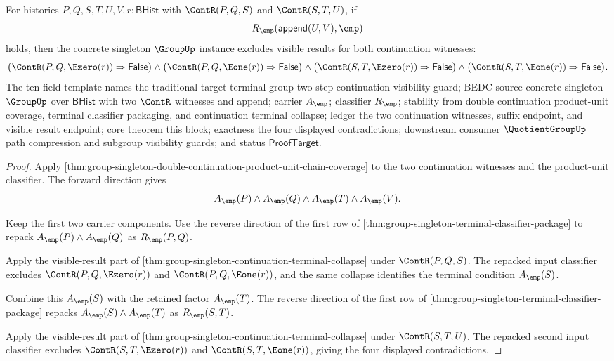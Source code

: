 \begin{theorem}
\label{thm:group-singleton-double-continuation-product-unit-visible-exclusion}
For histories $P,Q,S,T,U,V,r:\mathsf{BHist}$ with $\ContR(P,Q,S)$ and
$\ContR(S,T,U)$, if
$$
R_{\emp}(\mathsf{append}(U,V),\emp)
$$
holds, then the concrete singleton $\GroupUp$ instance excludes visible results
for both continuation witnesses:
$$
\bigl(\ContR(P,Q,\Ezero(r))\Rightarrow\mathsf{False}\bigr)\land
\bigl(\ContR(P,Q,\Eone(r))\Rightarrow\mathsf{False}\bigr)\land
\bigl(\ContR(S,T,\Ezero(r))\Rightarrow\mathsf{False}\bigr)\land
\bigl(\ContR(S,T,\Eone(r))\Rightarrow\mathsf{False}\bigr).
$$
The ten-field template names the traditional target terminal-group two-step
continuation visibility guard; BEDC source concrete singleton $\GroupUp$ over
$\mathsf{BHist}$ with two $\ContR$ witnesses and append; carrier $A_{\emp}$;
classifier $R_{\emp}$; stability from double continuation product-unit coverage,
terminal classifier packaging, and continuation terminal collapse; ledger the
two continuation witnesses, suffix endpoint, and visible result endpoint; core
theorem this block; exactness the four displayed contradictions; downstream
consumer $\QuotientGroupUp$ path compression and subgroup visibility guards; and
status $\mathsf{ProofTarget}$.
\end{theorem}
\begin{proof}
Apply
\autoref{thm:group-singleton-double-continuation-product-unit-chain-coverage} to
the two continuation witnesses and the product-unit classifier. The forward
direction gives
$$
A_{\emp}(P)\land A_{\emp}(Q)\land A_{\emp}(T)\land A_{\emp}(V).
$$

Keep the first two carrier components. Use the reverse direction of the first
row of \autoref{thm:group-singleton-terminal-classifier-package} to repack
$A_{\emp}(P)\land A_{\emp}(Q)$ as $R_{\emp}(P,Q)$.

Apply the visible-result part of
\autoref{thm:group-singleton-continuation-terminal-collapse} under
$\ContR(P,Q,S)$. The repacked input classifier excludes
$\ContR(P,Q,\Ezero(r))$ and $\ContR(P,Q,\Eone(r))$, and the same collapse
identifies the terminal condition $A_{\emp}(S)$.

Combine this $A_{\emp}(S)$ with the retained factor $A_{\emp}(T)$. The reverse
direction of the first row of
\autoref{thm:group-singleton-terminal-classifier-package} repacks
$A_{\emp}(S)\land A_{\emp}(T)$ as $R_{\emp}(S,T)$.

Apply the visible-result part of
\autoref{thm:group-singleton-continuation-terminal-collapse} under
$\ContR(S,T,U)$. The repacked second input classifier excludes
$\ContR(S,T,\Ezero(r))$ and $\ContR(S,T,\Eone(r))$, giving the four displayed
contradictions.
\end{proof}

